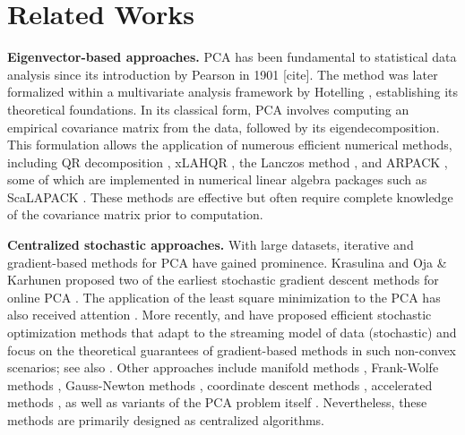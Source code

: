 \section{Related Works}
\vspace{-0.2cm}
\noindent \textbf{Eigenvector-based approaches.} PCA has been fundamental to statistical data analysis since its introduction by Pearson in 1901 [cite]. The method was later formalized within a multivariate analysis framework by Hotelling \cite{hotelling1933analysis}, establishing its theoretical foundations. In its classical form, PCA involves computing an empirical covariance matrix from the data, followed by its eigendecomposition. This formulation allows the application of numerous efficient numerical methods, including QR decomposition \cite{golub1996matrix}, xLAHQR \cite{dhillon2000xlahqr}, the Lanczos method \cite{lanczos1950iteration}, and ARPACK \cite{lehoucq1998arpack}, some of which are implemented in numerical linear algebra packages such as ScaLAPACK \cite{scalapack1997}. 
These methods are effective but often require complete knowledge of the covariance matrix prior to computation.

\noindent\textbf{Centralized stochastic approaches.} With large datasets, iterative and gradient-based methods for PCA have gained prominence.
Krasulina and Oja \& Karhunen proposed two of the earliest stochastic gradient descent methods for online PCA \cite{krasulina1969method, oja1985stochastic}. 
The application of the
least square minimization to the PCA has also received attention \cite{miao1998fast, yang1995projection, bannour1995principal, kung1994adaptive}.
More recently, \cite{arora2012stochastic} and \cite{shamir2015stochastic} have proposed efficient stochastic optimization methods that adapt to the streaming model of data (stochastic) and focus on the theoretical guarantees of gradient-based methods in such non-convex scenarios; see also \cite{boutsidis2014online, garber2015online, shamir2016fast, kim2020stochastic}.
Other approaches include manifold methods \cite{demidovich2024streamlining, chen2024sequential, wang2023incremental, absil2008optimization}, Frank-Wolfe methods \cite{beznosikov2023sarah}, Gauss-Newton methods \cite{zhou2023stochastic}, coordinate descent methods \cite{lei2016coordinate}, accelerated methods \cite{xu2018accelerated}, as well as variants of the PCA problem itself \cite{journee2010generalized, yuan2013truncated, han2014scale, kim2019simple, kim2019scale}.
Nevertheless, these methods are primarily designed as centralized algorithms.


